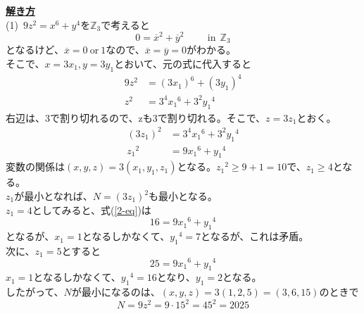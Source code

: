 \documentclass[11pt]{article}
\begin{document}
\underline{\textbf{解き方}}\\
(1)\ $9z^2 = x^6 + y^4$を$\mathbb{Z}_3$で考えると
\begin{equation*}
0= \overline{x}^2 + \overline{y}^2 \hspace{1cm} \mathrm{in} \ \ \mathbb{Z}_3
\end{equation*}
となるけど、$\overline{x} = 0\ \mathrm{or} \ 1$なので、$\overline{x}=\overline{y}=0$がわかる。\\
そこで、$x=3x_1 , y=3y_1$とおいて、元の式に代入すると\\
\begin{align*}
9z^2 &= {(3x_1)}^6 + {(3y_1)}^4\\
z^2 &= 3^4 {x_1}^6 + 3^2 {y_1}^4
\end{align*}
右辺は、3で割り切れるので、zも3で割り切れる。そこで、$z=3z_1$とおく。
\begin{align}
{(3z_1)}^2 &= 3^4 {x_1}^6 + 3^2 {y_1}^4 \nonumber \\
{z_1}^2 &= 9 {x_1}^6 + {y_1}^4 \label{2-eq}
\end{align}
変数の関係は$(x,y,z)=3(x_1 , y_1 , z_1)$となる。${z_1}^2 \geq 9+1 =10$で、$z_1 \geq 4$となる。\\
$z_1$が最小となれば、$N={(3z_1)}^2$も最小となる。\\
$z_1 = 4$としてみると、式(\ref{2-eq})は
\begin{equation*}
16 = 9 {x_1}^6 + {y_1}^4
\end{equation*}
となるが、$x_1=1$となるしかなくて、${y_1}^4 =7$となるが、これは矛盾。\\
次に、$z_1 = 5$とすると
\begin{equation*}
25 = 9 {x_1}^6 + {y_1}^4
\end{equation*}
$x_1=1$となるしかなくて、${y_1}^4 = 16$となり、$y_1=2$となる。\\
したがって、$N$が最小になるのは、$(x,y,z)=3(1,2,5)=(3,6,15)$のときで
\begin{equation*}
N=9z^2=9 \cdot 15^2 = 45^2 =2025
\end{equation*}

\newpage
\end{document}
